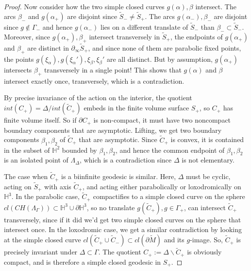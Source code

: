 \documentclass[10pt,a4paper]{amsart}
\newcommand{\BH}{\mathbb H}
\begin{document}
\begin{proof}
	Now consider how the two simple closed curves $g(\alpha),\beta$ intersect. The arcs $\beta_-$ and $g(\alpha_+)$ are disjoint since $\tilde S_-\neq \tilde S_+$. The arcs $g(\alpha_-),\beta_-$ are disjoint since $g\not\in \Gamma_-$ and hence $g(\alpha_-)$ lies on a different translate of $\tilde S_-$ than $\beta_- \subset \tilde S_-$. Moreover, since $g(\alpha_+),\beta_+$ intersect transversely in $\tilde S_+$, the endpoints of $g(\alpha_+)$ and $\beta_+$ are distinct in $\partial_\infty \tilde S_+$, and since none of them are parabolic fixed points, the points $g(\xi_\alpha),g(\xi_\alpha'),\xi_\beta,\xi_\beta'$ are all distinct. But by assumption, $g(\alpha_+)$ intersects $\beta_+$ transversely in a single point! This shows that $g(\alpha)$ and $\beta$ intersect exactly once, transversely, which is a contradiction.
	
		By precise invariance of the action on the interior, the quotient $int(C_+)=\Delta / int(\tilde C_+)$ embeds in the finite volume surface $S_+$, so $C_+$ has finite volume itself.  So if $\partial C_+$ is non-compact, it must have two noncompact boundary components that are asymptotic. Lifting, we get two boundary components $\beta_1,\beta_2$ of $\tilde C_+$ that are asymptotic. Since $\tilde C_+$ is convex, it is contained in the subset of $\BH^2$ bounded by $\beta_1,\beta_2$, and hence the common endpoint of $\beta_1,\beta_2$ is an isolated point of $\Lambda_\Delta$, which is a contradiction since $\Delta$ is not elementary.
		
		\medskip
		
	
	The case when $\tilde C_+$ is a biinfinite geodesic is similar. Here, $\Delta$ must be cyclic, acting on $\tilde S_+$ with axis $\tilde C_+$, and acting either parabolically or loxodromically on $\BH^3$. In the parabolic case, $\tilde C_+$ compactifies to a simple closed curve on the sphere $cl(CH(\Lambda_\Gamma))\subset \BH^3 \cup \partial \BH^3$, so no translate $g(\tilde C_+), g\in \Gamma_+$, can intersect $\tilde C_+$ transversely, since if it did we'd get two simple closed curves on the sphere that intersect once. In the loxodromic case, we get a similar contradiction by looking at the simple closed curve $cl(\tilde C_+ \cup \tilde C_-) \subset cl(\partial \tilde M)$ and its $g$-image. So, $\tilde C_+$ is precisely invariant under $\Delta \subset \Gamma$. The quotient $C_+ := \Delta \backslash \tilde C_+$ is obviously compact, and is therefore a simple closed geodesic in $S_+$.
\end{proof}
\end{document}
